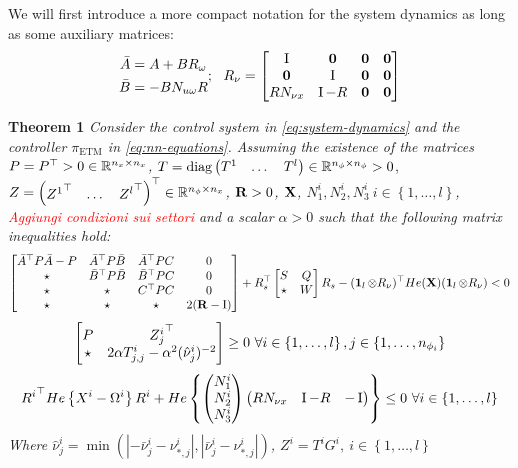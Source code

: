 \documentclass{article}
\begin{document}
We will first introduce a more compact notation for the system dynamics as long as some auxiliary matrices:
\begin{equation}
\begin{aligned}
    \bar{A} &= A + B R_{\omega}\\
    \bar{B} &= -B N_{u \omega} R\\
\end{aligned};\ \ 
R_{\nu} = \bmx{
  \Id & \0 & \0 & \0\\
  \0 & \Id & \0 & \0\\
  R N_{\nu x} & \Id - R & \0 & \0\\
}
\end{equation}

\textbf{Theorem 1} \emph{ Consider the control system in \ref{eq:system-dynamics} and the controller $\pi_{\text{ETM}}$ in \ref{eq:nn-equations}. Assuming the existence of the matrices $P = P^\top > 0 \in {\mathbb{R}}^{n_x \times n_x}$,} $T = \text{diag} \left(\begin{matrix}T^1 & \dots & T^l\end{matrix}\right) \in {\mathbb{R}}^{n_{\phi} \times n_{\phi}} > 0$, \emph{$Z = \left(\begin{matrix}{Z^1}^\top & \dots & {Z^l}^\top\end{matrix}\right)^\top \in {\mathbb{R}}^{n_{\phi} \times n_x}$, ${\bf{R}} > 0$, ${\bf{X}}$, $N^i_1, N^i_2, N^i_3 \ i \in \left\{ 1, \dots, l \right\}$, \textcolor{red}{Aggiungi condizioni sui settori} and a scalar $\alpha > 0$ such that the following matrix inequalities hold:}
\begin{equation}\label{eqn:lyapunov}
  \left[\begin{matrix}
    \bar{A}^\top P \bar{A} - P & \bar{A}^\top P \bar{B} & \bar{A}^\top P C & 0\\
    \star & \bar{B}^\top P \bar{B} & \bar{B}^\top P C & 0\\
    \star & \star & C^\top P C & 0\\
    \star & \star & \star & 2 ({\bf{R}} - \operatorname{I})
  \end{matrix}\right] + R_s^\top \left[\begin{matrix}
    S & Q\\
    \star & W
  \end{matrix}\right]  R_s - (\operatorname{\mathbf{1}}_l \otimes R_{\nu})^\top He({\bf{X}}) (\operatorname{\mathbf{1}}_l \otimes R_{\nu}) < 0
\end{equation}
\begin{equation}\label{eqn:inclusion}
  \left[\begin{matrix}
    P & {Z_j^i}^\top\\
    \star & 2 \alpha T^i_{j,j} - \alpha^2 (\hat{\nu}_j^i)^{-2}
  \end{matrix}\right] \geq 0 \ \forall i \in \left\{ 1, \dots, l \right\}, j \in \left\{ 1, \dots, n_{\phi_i} \right\}
\end{equation}
\begin{equation}\label{eqn:finsler-conditions}
  {R^i}^\top He\left\{X^i - \Omega^i\right\} R^i + He\left\{ \left(\begin{matrix}N^i_1\\ N^i_2\\ N^i_3\end{matrix}\right) \left(\begin{matrix}R N_{\nu x} & \operatorname{I} - R & -\operatorname{I}\end{matrix}\right)\right\} \leq 0 \ \forall i \in \left\{ 1, \dots, l \right\}
\end{equation}
\emph{Where $\hat{\nu}_j^i = \min(|-\bar{\nu}_j^i - \nu^i_{*, j}|,|\bar{\nu}_j^i - \nu^i_{*, j}|)$, $Z^i = T^i G^i,\ i \in \left\{ 1, \dots, l \right\} $}
\end{document}
